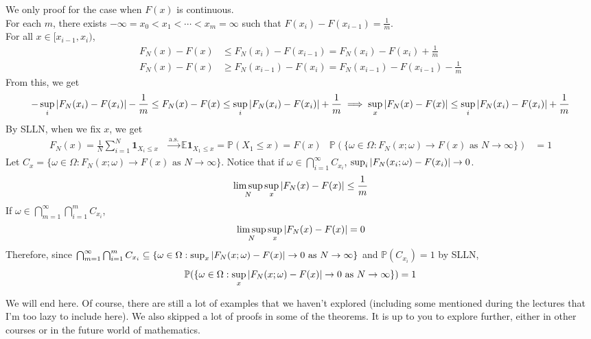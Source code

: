 \documentclass{huhtakm-template-book}
\newcommand{\prob}{\mathbb{P}}
\newcommand{\expect}{\mathbb{E}}
\begin{document}
\begin{proofing}
    We only proof for the case when $F(x)$ is continuous.\\
    For each $m$, there exists $-\infty=x_{0}<x_{1}<\cdots<x_{m}=\infty$ such that $F(x_{i})-F(x_{i-1})=\frac{1}{m}$.\\
    For all $x\in[x_{i-1},x_{i})$,
    \begin{align*}
        F_{N}(x)-F(x)&\leq F_{N}(x_{i})-F(x_{i-1})=F_{N}(x_{i})-F(x_{i})+\frac{1}{m}\\
        F_{N}(x)-F(x)&\geq F_{N}(x_{i-1})-F(x_{i})=F_{N}(x_{i-1})-F(x_{i-1})-\frac{1}{m}
    \end{align*}
    From this, we get
    \begin{equation*}
        -\sup_{i}\left|{F_{N}(x_{i})-F(x_{i})}\right|-\frac{1}{m}\leq F_{N}(x)-F(x)\leq\sup_{i}\left|{F_{N}(x_{i})-F(x_{i})}\right|+\frac{1}{m}\implies\sup_{x}\left|{F_{N}(x)-F(x)}\right|\leq\sup_{i}\left|{F_{N}(x_{i})-F(x_{i})}\right|+\frac{1}{m}
    \end{equation*}
    By SLLN, when we fix $x$, we get
    \begin{align*}
        F_{N}(x)=\frac{1}{N}\sum_{i=1}^{N}\mathbf{1}_{X_{i}\leq x}&\xrightarrow{\text{a.s.}}\expect\mathbf{1}_{X_{1}\leq x}=\prob(X_{1}\leq x)=F(x) & \prob(\{\omega\in\Omega:F_{N}(x;\omega)\to F(x)\text{ as }N\to\infty\})&=1
    \end{align*}
    Let $C_{x}=\{\omega\in\Omega:F_{N}(x;\omega)\to F(x)\text{ as }N\to\infty\}$. Notice that if $\omega\in\bigcap_{i=1}^{\infty}C_{x_{i}}$, $\sup_{i}\left|{F_{N}(x_{i};\omega)-F(x_{i})}\right|\to 0$.
    \begin{equation*}
        \limsup_{N}\sup_{x}\left|{F_{N}(x)-F(x)}\right|\leq\frac{1}{m}
    \end{equation*}
    If $\omega\in\bigcap_{m=1}^{\infty}\bigcap_{i=1}^{m}C_{x_{i}}$,
    \begin{equation*}
        \limsup_{N}\sup_{x}\left|{F_{N}(x)-F(x)}\right|=0
    \end{equation*}
    Therefore, since $\bigcap_{m=1}^{\infty}\bigcap_{i=1}^{m}C_{x_{i}}\subseteq\{\omega\in\Omega:\sup_{x}\left|{F_{N}(x;\omega)-F(x)}\right|\to 0\text{ as }N\to\infty\}$ and $\prob(C_{x_{i}})=1$ by SLLN,
    \begin{equation*}
        \prob(\{\omega\in\Omega:\sup_{x}\abs{F_{N}(x;\omega)-F(x)}\to 0\text{ as }N\to\infty\})=1
    \end{equation*}
\end{proofing}
We will end here. Of course, there are still a lot of examples that we haven't explored (including some mentioned during the lectures that I'm too lazy to include here). We also skipped a lot of proofs in some of the theorems. It is up to you to explore further, either in other courses or in the future world of mathematics.
\end{document}
